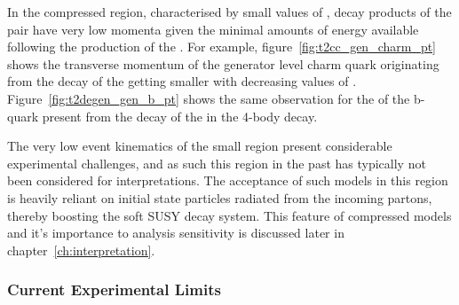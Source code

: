 In the compressed region, characterised by small values of \deltam, decay
products of the \sTop pair have very low momenta given the minimal amounts of
energy available following the production of the \chiz. For example, 
figure~\ref{fig:t2cc_gen_charm_pt} shows the transverse momentum of the
generator level charm quark originating from the decay of the \sTop getting
smaller
with decreasing values of \deltam. Figure~\ref{fig:t2degen_gen_b_pt} shows the
same observation for the \Pt of the b-quark present from the decay of the
\sTop in the 4-body decay.

The very low event kinematics of the small \deltam region present considerable
experimental challenges, and as such this region in the past has typically not
been considered for interpretations. The acceptance of such models in this
region is heavily reliant on initial state particles radiated from the
incoming partons, thereby boosting the soft SUSY decay system. This feature of
compressed models and it's importance to analysis sensitivity is discussed
later in chapter~\ref{ch:interpretation}.

\subsubsection{Current Experimental Limits}


